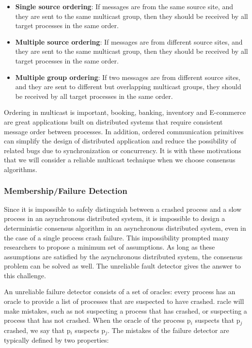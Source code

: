 \documentclass[12pt, a4paper]{article}
\begin{document}
\begin{itemize}
  \item \textbf{Single source ordering}: If messages are from the same source 
  site, and they are sent to the same multicast group, then they should be 
  received by all target processes in the same order. 
  \item \textbf{Multiple source ordering}: If messages are from different 
  source sites, and they are sent to the same multicast group, 
  then they should be received by all target processes in the same order. 
  \item \textbf{Multiple group ordering}: If two messages are from different 
  source sites, and they are sent to different but overlapping multicast groups, 
  they should be received by all target processes in the same order.
\end{itemize}

Ordering in multicast is important, booking, banking, inventory and E-commerce 
are great applications built on distributed systems that require consistent 
message order between processes. In addition, ordered communication primitives 
can simplify the design of distributed application and reduce the possibility of 
related bugs due to synchronization or concurrency\cite{garcia1991ordered}. It 
is with these motivations that we will consider a reliable multicast technique 
when we choose consensus algorithms.

\subsubsection{Membership/Failure Detection}

Since it is impossible to safely distinguish between a crashed process and a 
slow process in an asynchronous distributed system, it is impossible to design 
a deterministic consensus algorithm in an asynchronous distributed system, even 
in the case of a single process crash failure\cite{fischer1985impossibility}. 
This impossibility prompted many researchers to propose a minimum set of 
assumptions. As long as these assumptions are satisfied by the asynchronous 
distributed system, the consensus problem can be solved as well. The unreliable 
fault detector gives the answer to this challenge\cite{chandra1996unreliable}. 

An unreliable failure detector consists of a set of oracles: every process has 
an oracle to provide a list of processes that are suspected to have crashed. 
racle will make mistakes, such as not suspecting a process that has crashed, or 
suspecting a process that has not crashed. When the oracle of the process 
p$_{i}$ suspects that p$_{j}$ crashed, we say that p$_{i}$ suspects p$_{j}$. 
The mistakes of the failure detector are typically defined by two properties:
\end{document}
